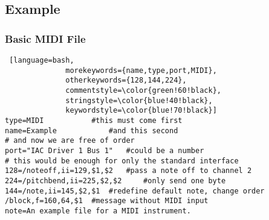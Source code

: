 \documentclass[12pt]{article}
\begin{document}
\clearpage

\subsection{Example}
\subsubsection{Basic MIDI File}
\begin{lstlisting} [language=bash,
			  morekeywords={name,type,port,MIDI},
			  otherkeywords={128,144,224},
			  commentstyle=\color{green!60!black},
			  stringstyle=\color{blue!40!black},
			  keywordstyle=\color{blue!70!black}]
type=MIDI 			#this must come first
name=Example			#and this second
# and now we are free of order
port="IAC Driver 1 Bus 1" 	#could be a number
# this would be enough for only the standard interface
128=/noteoff,ii=129,$1,$2 	#pass a note off to channel 2
224=/pitchbend,ii=225,$2,$2 	#only send one byte
144=/note,ii=145,$2,$1	#redefine default note, change order
/block,f=160,64,$1	#message without MIDI input
note=An example file for a MIDI instrument.
\end{lstlisting}

\vspace{3cm}
\end{document}
